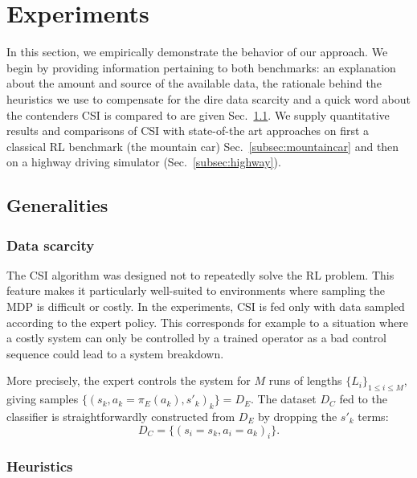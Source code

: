 \documentclass[smallextended]{svjour3}
\begin{document}
\section{Experiments}
\label{sec:experiments}
In this section, we empirically demonstrate the behavior of our approach. We begin by providing information pertaining to both benchmarks: an explanation about the amount and source of the available data, the rationale behind the heuristics we use to compensate for the dire data scarcity and a quick word about the contenders CSI is compared to are given Sec.~\ref{subsec:generalities}. We supply quantitative results and comparisons of CSI with state-of-the art approaches on first a classical RL benchmark (the mountain car) Sec.~\ref{subsec:mountaincar} and then on a highway driving simulator (Sec.~\ref{subsec:highway}).
\subsection{Generalities}
\label{subsec:generalities}
\subsubsection{Data scarcity}
\label{subsubsec:data}
The CSI algorithm was designed not to repeatedly solve the RL problem. This feature makes it particularly well-suited to environments where sampling the MDP is difficult or costly. In the experiments, CSI is fed only with data sampled according to the expert policy. This corresponds for example to a situation where a costly system can only be controlled by a trained operator as a bad control sequence could lead to a system breakdown.

More precisely, the expert controls the system for $M$ runs of lengths $\{L_i\}_{1\leq i \leq M}$, %
giving samples $\{(s_k,a_k=\pi_E(a_k),s'_k)_k\} = D_E$. The dataset $D_C$ fed to the classifier is straightforwardly constructed from $D_E$ by dropping the $s'_k$ terms:
\begin{equation}
  D_C = \{(s_i = s_k,a_i=a_k)_i\}.
\end{equation}
\subsubsection{Heuristics}
\label{subsubsec:heuristics}
\end{document}
